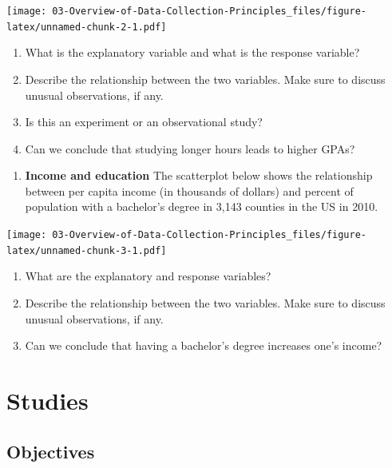 \documentclass[
]{book}
\providecommand{\tightlist}{%
  \setlength{\itemsep}{0pt}\setlength{\parskip}{0pt}}
\begin{document}
\texttt{[image: 03-Overview-of-Data-Collection-Principles\_files/figure-latex/unnamed-chunk-2-1.pdf]}

\begin{enumerate}
\def\labelenumi{\alph{enumi}.}
\tightlist
\item
  What is the explanatory variable and what is the response variable?
\item
  Describe the relationship between the two variables. Make sure to discuss unusual observations, if any.
\item
  Is this an experiment or an observational study?
\item
  Can we conclude that studying longer hours leads to higher GPAs?
\end{enumerate}

\pagebreak

\begin{enumerate}
\def\labelenumi{\arabic{enumi}.}
\setcounter{enumi}{2}
\tightlist
\item
  \textbf{Income and education} The scatterplot below shows the relationship between per capita income (in thousands of dollars) and percent of population with a bachelor's degree in 3,143 counties in the US in 2010.
\end{enumerate}

\texttt{[image: 03-Overview-of-Data-Collection-Principles\_files/figure-latex/unnamed-chunk-3-1.pdf]}

\begin{enumerate}
\def\labelenumi{\alph{enumi}.}
\tightlist
\item
  What are the explanatory and response variables?\\
\item
  Describe the relationship between the two variables. Make sure to discuss unusual observations, if any.\\
\item
  Can we conclude that having a bachelor's degree increases one's income?
\end{enumerate}

\hypertarget{STUDY}{%
\chapter{Studies}\label{STUDY}}

\hypertarget{objectives-3}{%
\section{Objectives}\label{objectives-3}}
\end{document}

